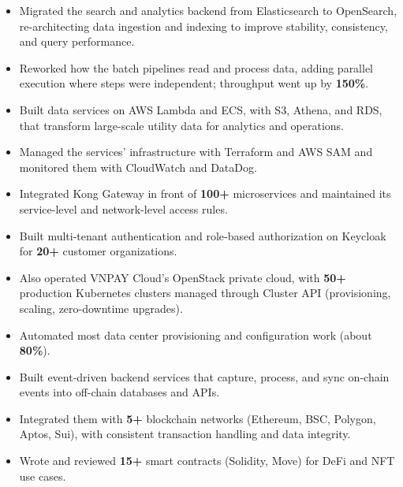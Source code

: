\begin{itemize}
    \item Migrated the search and analytics backend from Elasticsearch to OpenSearch, re-architecting data ingestion and indexing to improve stability, consistency, and query performance. %
    \item Reworked how the batch pipelines read and process data, adding parallel execution where steps were independent; throughput went up by \textbf{150\%}. %
    \item Built data services on AWS Lambda and ECS, with S3, Athena, and RDS, that transform large-scale utility data for analytics and operations. %
    \item Managed the services' infrastructure with Terraform and AWS SAM and monitored them with CloudWatch and DataDog. %
\end{itemize}

\begin{itemize}
    \item Integrated Kong Gateway in front of \textbf{100+} microservices and maintained its service-level and network-level access rules. %
    \item Built multi-tenant authentication and role-based authorization on Keycloak for \textbf{20+} customer organizations. %
    \item Also operated VNPAY Cloud's OpenStack private cloud, with \textbf{50+} production Kubernetes clusters managed through Cluster API (provisioning, scaling, zero-downtime upgrades). %
    \item Automated most data center provisioning and configuration work (about \textbf{80\%}). %
\end{itemize}

\begin{itemize}
    \item Built event-driven backend services that capture, process, and sync on-chain events into off-chain databases and APIs. %
    \item Integrated them with \textbf{5+} blockchain networks (Ethereum, BSC, Polygon, Aptos, Sui), with consistent transaction handling and data integrity. %
    \item Wrote and reviewed \textbf{15+} smart contracts (Solidity, Move) for DeFi and NFT use cases. %
\end{itemize}

